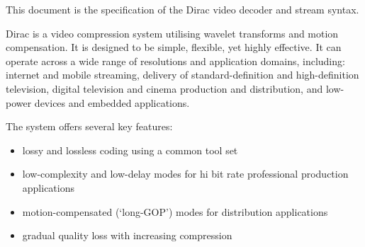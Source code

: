 
This document is the specification of the Dirac video decoder and stream syntax.

Dirac is a video compression system utilising wavelet transforms and motion
compensation. It is designed to be simple, flexible, yet highly effective. 
It can operate across a wide range of resolutions and
application domains, including: internet and mobile streaming, delivery of 
standard-definition and high-definition
television, digital television and cinema production and distribution,
and low-power devices and embedded applications.

The system offers several key features:
\begin{itemize}
  \item lossy and lossless coding using a common tool set
    \item low-complexity and low-delay modes for hi bit rate professional production applications
  \item motion-compensated (`long-GOP') modes for distribution applications
	\item gradual quality loss with increasing compression 
\end{itemize}



